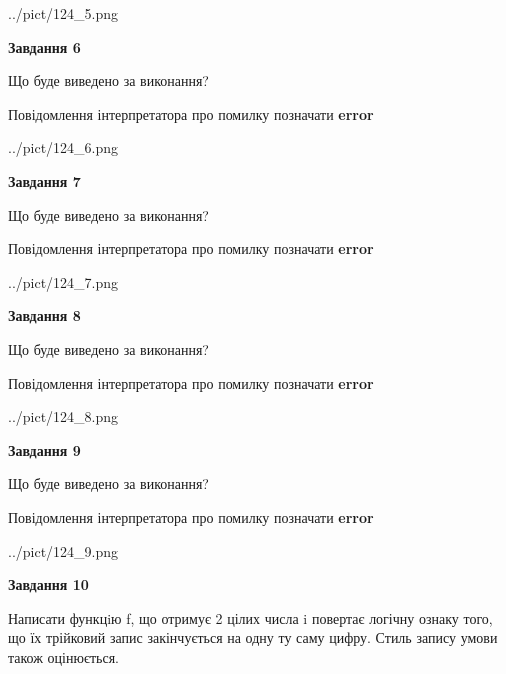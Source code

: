 \documentclass[12pt, ukrainian]{article}
\begin{document}
{\begin {large}
\begin{center}
	{../pict/124_5.png}
\end{center}
\newpage

{\begin {center}\textbf{Завдання 6}\end {center}}\par
Що буде виведено за виконання? \par
Повідомлення інтерпретатора про помилку позначати \textbf{error}

\begin{center}
	{../pict/124_6.png}
\end{center}
\newpage

{\begin {center}\textbf{Завдання 7}\end {center}}\par
Що буде виведено за виконання? \par
Повідомлення інтерпретатора про помилку позначати \textbf{error}

\begin{center}
	{../pict/124_7.png}
\end{center}
\newpage

{\begin {center}\textbf{Завдання 8}\end {center}}\par
Що буде виведено за виконання? \par
Повідомлення інтерпретатора про помилку позначати \textbf{error}

\begin{center}
	{../pict/124_8.png}
\end{center}
\newpage

{\begin {center}\textbf{Завдання 9}\end {center}}\par
Що буде виведено за виконання? \par
Повідомлення інтерпретатора про помилку позначати \textbf{error}

\begin{center}
	{../pict/124_9.png}
\end{center}
\newpage

{\begin {center}\textbf{Завдання 10}\end {center}}\par

Написати функцiю f, що отримує 2 цілих числа i повертає логічну ознаку того, що їх трійковий запис закінчується на одну ту саму цифру. Стиль запису умови також оцінюється.\par
\newpage

\end {large}}
\end{document}
